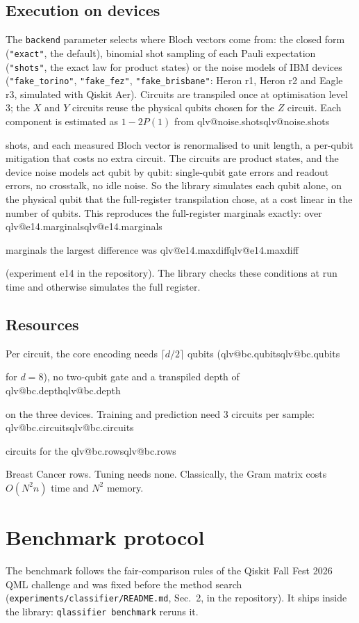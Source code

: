 \documentclass[aps,pra,reprint,superscriptaddress,nofootinbib,longbibliography]{revtex4-2}
\makeatletter
\newcommand{\val}[1]{\ifcsname qlv@#1\endcsname\csname qlv@#1\endcsname\else
  \PackageError{qlassifier}{No value '#1'}{Run python scripts/paper_tables.py}\fi}
\newcommand{\code}[1]{\texttt{#1}}
\makeatother
\begin{document}
\subsection{Execution on devices}
The \code{backend} parameter selects where Bloch vectors come from: the closed form (\code{"exact"}, the default),
binomial shot sampling of each Pauli expectation (\code{"shots"}, the exact law for product states) or the noise models
of IBM devices (\code{"fake\_torino"}, \code{"fake\_fez"}, \code{"fake\_brisbane"}: Heron r1, Heron r2 and Eagle r3,
simulated with Qiskit Aer). Circuits are transpiled once at optimisation level 3; the $X$ and $Y$ circuits reuse the
physical qubits chosen for the $Z$ circuit. Each component is estimated as $1 - 2P(1)$ from \val{noise.shots} shots, and
each measured Bloch vector is renormalised to unit length, a per-qubit mitigation that costs no extra circuit. The
circuits are product states, and the device noise models act qubit by qubit: single-qubit gate errors and readout
errors, no crosstalk, no idle noise. So the library simulates each qubit alone, on the physical qubit that the
full-register transpilation chose, at a cost linear in the number of qubits. This reproduces the full-register
marginals exactly: over \val{e14.marginals} marginals the largest difference was \val{e14.maxdiff} (experiment e14 in
the repository). The library checks these conditions at run time and otherwise simulates
the full register.

\subsection{Resources}
Per circuit, the core encoding needs $\lceil d/2 \rceil$ qubits (\val{bc.qubits} for $d = 8$), no two-qubit gate and a
transpiled depth of \val{bc.depth} on the three devices. Training and prediction need 3 circuits per sample:
\val{bc.circuits} circuits for the \val{bc.rows} Breast Cancer rows. Tuning needs none. Classically, the Gram matrix
costs $O(N^2 n)$ time and $N^2$ memory.

\section{Benchmark protocol}
\label{sec:protocol}

The benchmark follows the fair-comparison rules of the Qiskit Fall Fest 2026 QML challenge and was fixed before the
method search (\code{experiments/classifier/README.md}, Sec.~2, in the repository). It ships inside the library: \code{qlassifier benchmark}
reruns it.
\end{document}
